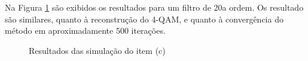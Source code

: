 \documentclass[review]{elsarticle}
\begin{document}
Na Figura \ref{fig:input-noise-c} são exibidos os resultados para um filtro de 20a ordem. Os resultado são similares, quanto à reconstrução do 4-QAM, e quanto à convergência do método em aproximadamente 500 iterações.

\begin{figure}[htb!]
  \centering
    \qquad
	\caption{Resultados das simulação do item (c)}

  \label{fig:input-noise-c}
\end{figure}
\end{document}
